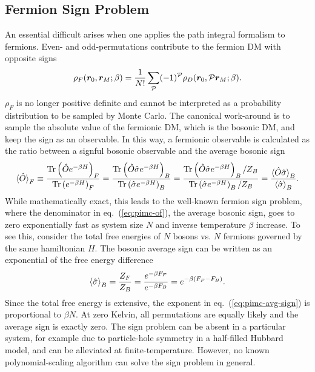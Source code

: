 \subsection{Fermion Sign Problem} \label{sec:fermion-sign-problem}
An essential difficult arises when one applies the path integral formalism to fermions. Even- and odd-permutations contribute to the fermion DM with opposite signs
\begin{align}
\rho_F(\boldsymbol{r}_0,\boldsymbol{r}_M;\beta) = \frac{1}{N!}\sum\limits_{\mathcal{P}} (-1)^{\mathcal{P}} \rho_D(\boldsymbol{r}_0, \mathcal{P}\boldsymbol{r}_M;\beta).
\end{align}
$\rho_F$ is no longer positive definite and cannot be interpreted as a probability distribution to be sampled by Monte Carlo. The canonical work-around is to sample the absolute value of the fermionic DM, which is the bosonic DM, and keep the sign as an observable. In this way, a fermionic observable is calculated as the ratio between a signful bosonic observable and the average bosonic sign
\begin{align} \label{eq:pimc-of}
\braket{\hat{O}}_F \equiv \dfrac{\text{Tr}\left(\hat{O}e^{-\beta H}\right)_F}{\text{Tr}\left(e^{-\beta H}\right)_F}=
\dfrac{\text{Tr}\left(\hat{O}\hat{\sigma}e^{-\beta H}\right)_B}{\text{Tr}\left(\hat{\sigma} e^{-\beta H}\right)_B}=
\dfrac{\text{Tr}\left(\hat{O}\hat{\sigma}e^{-\beta H}\right)_B/Z_B}{\text{Tr}\left(\hat{\sigma} e^{-\beta H}\right)_B/Z_B}=\dfrac{\braket{\hat{O}\hat{\sigma}}_B}{ \braket{\hat{\sigma}}_B }.
\end{align}
While mathematically exact, this leads to the well-known fermion sign problem, where the denominator in eq.~(\ref{eq:pimc-of}), the average bosonic sign, goes to zero exponentially fast as system size $N$ and inverse temperature $\beta$ increase.
To see this, consider the total free energies of $N$ bosons vs. $N$ fermions governed by the same hamiltonian $H$. The bosonic average sign can be written as an exponential of the free energy difference
\begin{align} \label{eq:pimc-avg-sign}
\braket{\hat{\sigma}}_B = \dfrac{Z_F}{Z_B} = \dfrac{e^{-\beta F_F}}{e^{-\beta F_B}} = e^{-\beta (F_F-F_B)}.
\end{align}
Since the total free energy is extensive, the exponent in eq.~(\ref{eq:pimc-avg-sign}) is proportional to $\beta N$.
At zero Kelvin, all permutations are equally likely and the average sign is exactly zero. The sign problem can be absent in a particular system, for example due to particle-hole symmetry in a half-filled Hubbard model, and can be alleviated at finite-temperature. However, no known polynomial-scaling algorithm can solve the sign problem in general.

